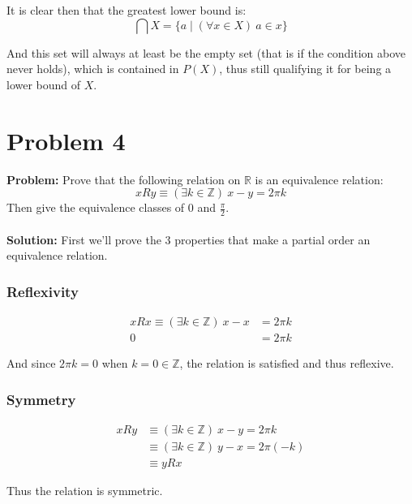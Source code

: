 \documentclass{article}
\begin{document}
It is clear then that the greatest lower bound is:
$$\bigcap X=\{a\mid (\forall x\in X)\ a\in x\}$$

And this set will always at least be the empty set (that is if the condition above never holds), which is contained in $P(X)$, thus still qualifying it for being a lower bound of $X$.

\section*{Problem 4}
\textbf{Problem:} Prove that the following relation on $\mathbb R$ is an equivalence relation:
$$xRy\equiv (\exists k\in\mathbb Z)\ x-y=2\pi k$$
Then give the equivalence classes of 0 and $\frac{\pi}{2}$.
\\\\
\textbf{Solution:} First we'll prove the 3 properties that make a partial order an equivalence relation.
\subsubsection*{Reflexivity}
\begin{align*}
xRx\equiv (\exists k\in\mathbb Z)\ x-x&=2\pi k\\
0&=2\pi k
\end{align*}

And since $2\pi k=0$ when $k=0\in\mathbb Z$, the relation is satisfied and thus reflexive.

\subsubsection*{Symmetry}
\begin{align*}
xRy&\equiv (\exists k\in\mathbb Z)\ x-y=2\pi k\\
&\equiv(\exists k\in\mathbb Z)\ y-x=2\pi (-k)\tag{anti-commutativity of subtraction}\\
&\equiv yRx\tag{closure of $\mathbb Z$ under additive inverse}
\end{align*}

Thus the relation is symmetric.
\end{document}
